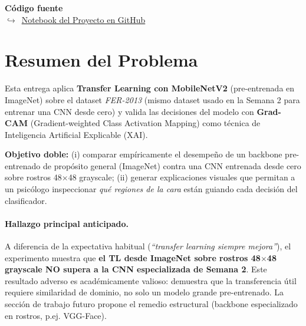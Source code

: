 \documentclass[10pt,a4paper,twocolumn]{article}
\newcommand{\githuburl}{https://github.com/georgenton/UIDE-Aprendizaje-Profundo/blob/main/semana-3/TransferLearning\_FER2013\_Grupo5.ipynb}
\begin{document}

\begin{codigofuente}
\textbf{Código fuente}\\[2pt]
$\hookrightarrow$~\href{\githuburl}{Notebook del Proyecto en GitHub}
\end{codigofuente}

\section{Resumen del Problema}

Esta entrega aplica \textbf{Transfer Learning con MobileNetV2} (pre-entrenada en ImageNet) sobre el dataset \textit{FER-2013} (mismo dataset usado en la Semana 2 para entrenar una CNN desde cero) y valida las decisiones del modelo con \textbf{Grad-CAM} (Gradient-weighted Class Activation Mapping) como técnica de Inteligencia Artificial Explicable (XAI).

\textbf{Objetivo doble:} (i) comparar empíricamente el desempeño de un backbone pre-entrenado de propósito general (ImageNet) contra una CNN entrenada desde cero sobre rostros 48$\times$48 grayscale; (ii) generar explicaciones visuales que permitan a un psicólogo inspeccionar \textit{qué regiones de la cara} están guiando cada decisión del clasificador.

\paragraph{Hallazgo principal anticipado.} A diferencia de la expectativa habitual (\textit{``transfer learning siempre mejora''}), el experimento muestra que \textbf{el TL desde ImageNet sobre rostros 48$\times$48 grayscale NO supera a la CNN especializada de Semana 2}. Este resultado adverso es académicamente valioso: demuestra que la transferencia útil requiere similaridad de dominio, no solo un modelo grande pre-entrenado. La sección de trabajo futuro propone el remedio estructural (backbone especializado en rostros, p.ej. VGG-Face).
\end{document}
